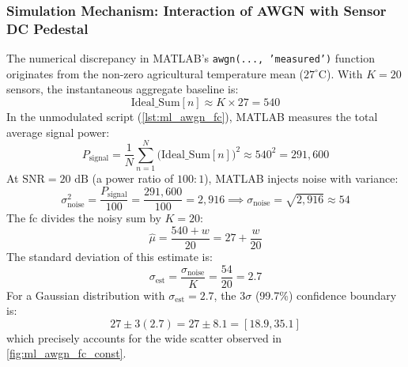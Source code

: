 \documentclass[Markos_Delaportas_1316.tex]{subfiles}
\begin{document}
\subsubsection{Simulation Mechanism: Interaction of AWGN with Sensor
DC Pedestal}
The numerical discrepancy in MATLAB's \texttt{awgn(..., 'measured')}
function originates from the non-zero agricultural temperature
mean ($27^\circ\text{C}$). With $K = 20$ sensors, the instantaneous
aggregate baseline is:
\begin{equation}
    \text{Ideal\_Sum}[n] \approx K \times 27 = 540
    \label{eq:dc_pedestal}
\end{equation}
In the unmodulated script (\cref{lst:ml_awgn_fc}), MATLAB measures
the total average signal power:
\begin{equation}
    P_{\text{signal}} = \frac{1}{N} \sum_{n=1}^N
    \big(\text{Ideal\_Sum}[n]\big)^2 \approx 540^2 = 291{,}600
    \label{eq:signal_power}
\end{equation}
At $\text{SNR} = 20\text{ dB}$ (a power ratio of $100:1$), MATLAB
injects noise with variance:
\begin{equation}
    \sigma_{\text{noise}}^2 = \frac{P_{\text{signal}}}{100} =
    \frac{291{,}600}{100} = 2{,}916 \implies \sigma_{\text{noise}} =
    \sqrt{2{,}916} \approx 54
    \label{eq:awgn_variance}
\end{equation}
The \gls{fc} divides the noisy sum by $K = 20$:
\begin{equation}
    \hat{\mu} = \frac{540 + w}{20} = 27 + \frac{w}{20}
    \label{eq:estimated_average_dc}
\end{equation}
The standard deviation of this estimate is:
\begin{equation}
    \sigma_{\text{est}} = \frac{\sigma_{\text{noise}}}{K} = \frac{54}{20} = 2.7
    \label{eq:estimated_average_deviation}
\end{equation}
For a Gaussian distribution with $\sigma_{\text{est}} = 2.7$, the
$3\sigma$ (99.7\%) confidence boundary is:
\begin{equation}
    27 \pm 3(2.7) = 27 \pm 8.1 = [18.9, 35.1]
    \label{eq:confidence_interval_unfiltered}
\end{equation}
which precisely accounts for the wide scatter observed in
\cref{fig:ml_awgn_fc_const}.
\end{document}
